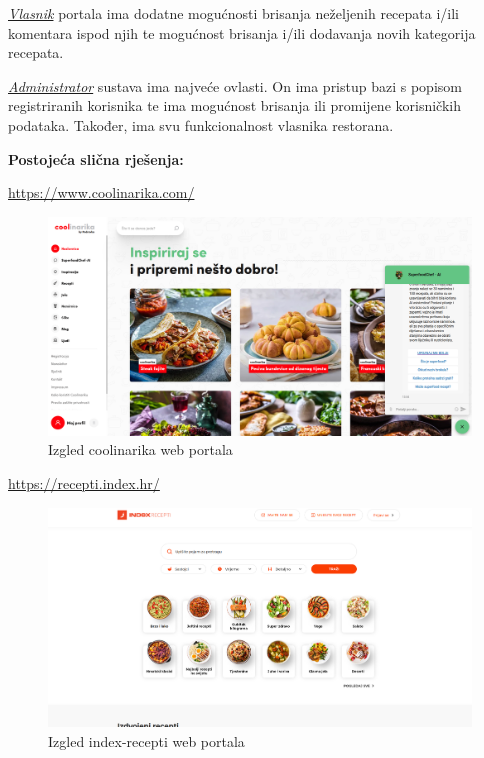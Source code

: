 		\underline{\textit{Vlasnik}} portala ima dodatne mogućnosti brisanja neželjenih recepata i/ili komentara ispod njih
		te mogućnost brisanja i/ili dodavanja novih kategorija recepata.

		\underline{\textit{Administrator}} sustava ima najveće ovlasti. On ima pristup bazi s popisom registriranih korisnika
		te ima mogućnost brisanja ili promijene korisničkih podataka. Također, ima svu funkcionalnost vlasnika restorana.
		
		\bigskip

		\textbf{Postojeća slična rješenja:}

		\url{https://www.coolinarika.com/}

		\begin{figure}[H]
			\includegraphics[scale=0.2]{slike/coolinarika.png}
			\centering
			\caption{Izgled coolinarika web portala}
			\label{fig:coolinarika}
		\end{figure}

		\url{https://recepti.index.hr/}

		\begin{figure}[H]
			\includegraphics[scale=0.2]{slike/index-recepti.png} 
			\centering
			\caption{Izgled index-recepti web portala}
			\label{fig:index-recepti}
		\end{figure}

